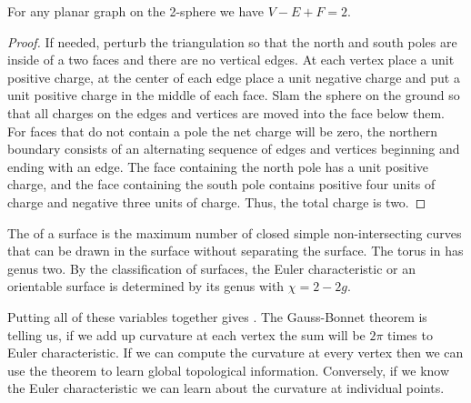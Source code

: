 \begin{theorem}\label{thm:euler}
For any planar graph on the 2-sphere we have $V-E+F=2.$
\end{theorem}

\begin{proof}
If needed, perturb the triangulation so that the north and south poles are 
inside of a two faces and there are no vertical edges. At each vertex place a unit positive
charge, at the center of each edge place a unit negative charge and put a unit positive
charge in the middle of each face. Slam the sphere on the ground so that all charges
on the edges and vertices are moved into the face below them. For faces that do not contain a pole
the net charge will be zero, the northern boundary consists of an alternating sequence
of edges and vertices  beginning  and ending with an edge.
The face containing the north pole has a unit positive charge, and the face containing the south
pole contains positive four units of charge and negative three units of charge.
Thus, the total charge is two.

\end{proof}

The  of a surface is the maximum  number of closed simple
non-intersecting curves that can be drawn in the surface without separating
the surface.
The torus in  has genus two.
By the classification of surfaces, the Euler characteristic or an orientable surface
is determined by its genus with $\chi=2-2g$.

Putting all of these variables together gives .
The  Gauss-Bonnet theorem is  telling us, if we add up curvature
at each vertex the sum will be $2\pi$ times to Euler characteristic.
If we can compute the curvature at every vertex then we can use the theorem
to learn global topological information.
Conversely, if we know the Euler characteristic we can learn about the curvature
at individual points.
